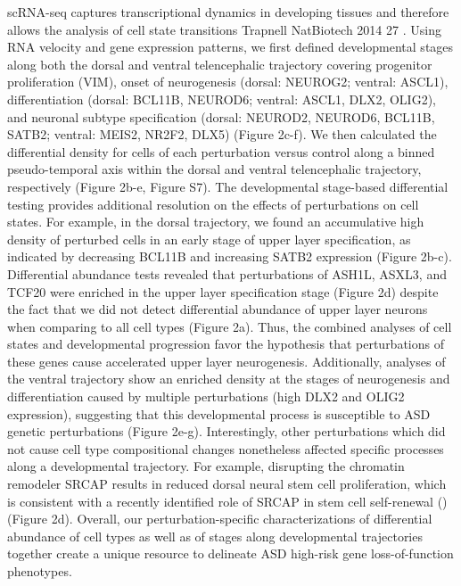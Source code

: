 scRNA-seq captures transcriptional dynamics in developing tissues and therefore allows the analysis of cell state transitions {Trapnell NatBiotech 2014} 27 . Using RNA velocity and gene expression patterns, we first defined developmental stages along both the dorsal and ventral telencephalic trajectory covering progenitor proliferation (VIM), onset of neurogenesis (dorsal: NEUROG2; ventral: ASCL1), differentiation (dorsal: BCL11B, NEUROD6; ventral: ASCL1, DLX2, OLIG2), and neuronal subtype specification (dorsal: NEUROD2, NEUROD6, BCL11B, SATB2; ventral: MEIS2, NR2F2, DLX5) (Figure 2c-f). We then calculated the differential density for cells of each perturbation versus control along a binned pseudo-temporal axis within the dorsal and ventral telencephalic trajectory, respectively (Figure 2b-e, Figure S7). 
The developmental stage-based differential testing provides additional resolution on the effects of perturbations on cell states. For example, in the dorsal trajectory, we found an accumulative high density of perturbed cells in an early stage of upper layer specification, as indicated by decreasing BCL11B and increasing SATB2 expression (Figure 2b-c). Differential abundance tests revealed that perturbations of ASH1L, ASXL3, and TCF20 were enriched in the upper layer specification stage (Figure 2d) despite the fact that we did not detect differential abundance of upper layer neurons when comparing to all cell types (Figure 2a). Thus, the combined analyses of cell states and developmental progression favor the hypothesis that perturbations of these genes cause accelerated upper layer neurogenesis. Additionally, analyses of the ventral trajectory show an enriched density at the stages of neurogenesis and differentiation caused by multiple perturbations (high DLX2 and OLIG2 expression), suggesting that this developmental process is susceptible to ASD genetic perturbations (Figure 2e-g). Interestingly, other perturbations which did not cause cell type compositional changes nonetheless affected specific processes along a developmental trajectory. For example, disrupting the chromatin remodeler SRCAP results in reduced dorsal neural stem cell proliferation, which is consistent with a recently identified role of SRCAP in stem cell self-renewal (\cite{funayama_chchd2_2015})(Figure 2d). 
Overall, our perturbation-specific characterizations of differential abundance of cell types as well as of stages along developmental trajectories together create a unique resource to delineate ASD high-risk gene loss-of-function phenotypes.

